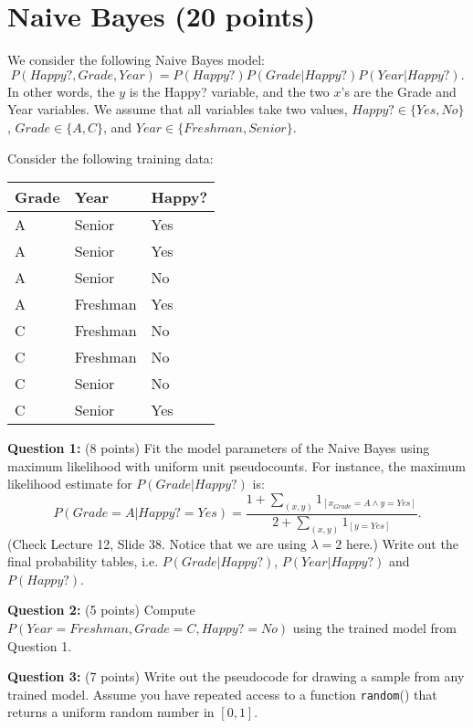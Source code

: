 \section{Naive Bayes (20 points)}

We consider the following Naive Bayes model:
$$P(Happy?,Grade,Year) = P(Happy?)P(Grade|Happy?)P(Year|Happy?).$$
In other words, the $y$ is the Happy? variable, and the two $x$'s are the Grade and Year variables.  We assume that all variables take two values, $Happy? \in \{Yes,No\}$, $Grade\in\{A,C\}$, and $Year\in\{Freshman,Senior\}$.


Consider the following training data:
\begin{center}
\begin{tabular}{lll}
\hline
\hline
Grade & Year & Happy?\\
\hline
A & Senior & Yes\\
A & Senior & Yes\\
A & Senior & No\\
A & Freshman & Yes\\
C & Freshman & No\\
C & Freshman & No\\
C & Senior & No\\
C & Senior & Yes\\
\hline
\hline
\end{tabular}
\end{center}

\smallskip

\textbf{Question 1:} (8 points) Fit the model parameters of the Naive Bayes using maximum likelihood with uniform unit pseudocounts.  For instance, the maximum likelihood estimate for $P(Grade|Happy?)$ is:
$$P(Grade=A|Happy?=Yes) = \frac{1 + \sum_{(x,y)}{1_{[x_{Grade}=A\wedge y=Yes]}}}{2 + \sum_{(x,y)}{1_{[y=Yes]}}}.$$ (Check Lecture 12, Slide 38. Notice that we are using $\lambda = 2$ here.)
Write out the final probability tables, i.e. $P(Grade | Happy?)$, $P(Year | Happy?)$ and $P(Happy?)$.

\smallskip

\textbf{Question 2:} (5 points) Compute $P(Year=Freshman,Grade=C,Happy?=No)$ using the trained model from Question 1.


\smallskip

\textbf{Question 3:} (7 points) Write out the pseudocode for drawing a sample from any trained model.  Assume you have repeated access to a function \texttt{random}() that returns a uniform random number in $[0,1]$.
